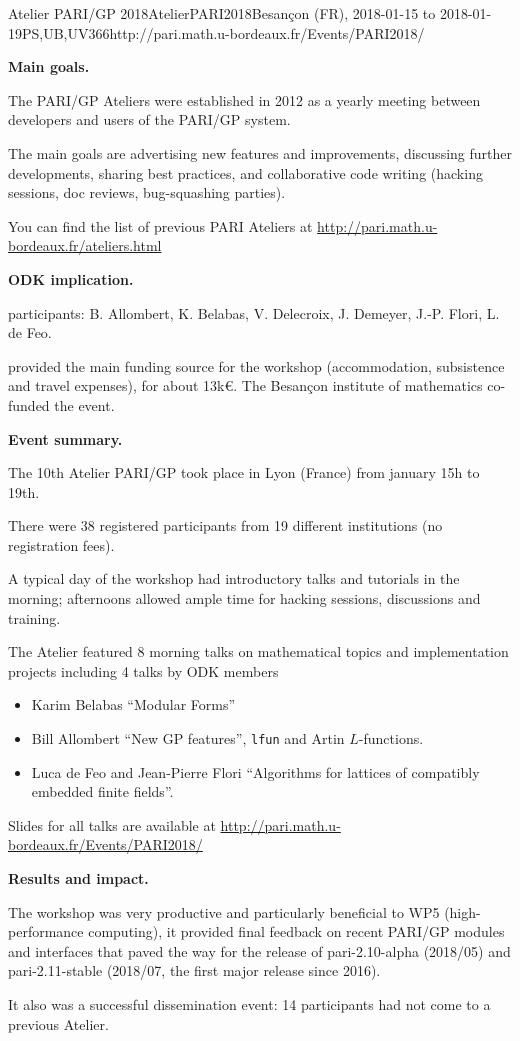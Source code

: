 \begin{event}{Atelier PARI/GP 2018}{AtelierPARI2018}{Besan\c{c}on (FR),
2018-01-15 to 2018-01-19}{PS,UB,UV}{36}{6}{http://pari.math.u-bordeaux.fr/Events/PARI2018/}

\textbf{Main goals.}

The PARI/GP Ateliers were established in 2012 as a yearly meeting
between developers and users of the PARI/GP system.

The main goals are advertising new features and improvements,
discussing further developments, sharing best practices, and collaborative
code writing (hacking sessions, doc reviews, bug-squashing parties).

You can find the list of previous PARI Ateliers at
\url{http://pari.math.u-bordeaux.fr/ateliers.html}

\textbf{ODK implication.} 

\ODK participants: B. Allombert, K. Belabas, V. Delecroix, J. Demeyer,
J.-P. Flori, L. de Feo.

\ODK provided the main funding source for the workshop (accommodation,
subsistence and travel expenses), for about 13k\euro. The Besan\c{c}on
institute of mathematics co-funded the event.

\textbf{Event summary.} 

The 10th Atelier PARI/GP took place in Lyon (France) from january
15h to 19th.

There were 38 registered participants from 19 different institutions
(no registration fees).

A typical day of the workshop had introductory talks and tutorials
in the morning; afternoons allowed ample time for hacking sessions,
discussions and training.

The Atelier featured 8 morning talks on mathematical topics and
implementation projects including 4 talks by ODK members
\begin{itemize}
\item Karim Belabas ``Modular Forms''
\item Bill Allombert ``New GP features'', \texttt{lfun} and Artin
  $L$-functions.
\item Luca de Feo and Jean-Pierre Flori ``Algorithms for lattices of
  compatibly embedded finite fields''.
\end{itemize}

Slides for all talks are available at
\url{http://pari.math.u-bordeaux.fr/Events/PARI2018/}

\textbf{Results and impact.} 

The workshop was very productive and particularly beneficial to WP5
(high-performance computing), it provided final feedback on recent PARI/GP
  modules and interfaces that paved the way for the release of
  pari-2.10-alpha (2018/05) and pari-2.11-stable (2018/07, the first major
  release since 2016).
  
It also was a successful dissemination event: 14 participants had not come to
  a previous Atelier.
\end{event}
